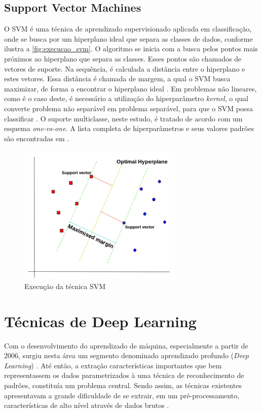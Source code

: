 \subsection{Support Vector Machines}

O SVM é uma técnica de aprendizado supervisionado aplicada em classificação, onde se busca por um hiperplano ideal que separa as classes de dados, conforme ilustra a \autoref{fig:execucao_svm}. O algoritmo se inicia com a busca pelos pontos mais próximos ao hiperplano que separa as classes. Esses pontos são chamados de vetores de suporte. Na sequência, é calculada a distância entre o hiperplano e estes vetores. Essa distância é chamada de margem, a qual o SVM busca maximizar, de forma a encontrar o hiperplano ideal \cite{Pupale2019}. Em problemas não lineares, como é o caso deste, é necessário a utilização do hiperparâmetro \textit{kernel}, o qual converte problema não separável em problema separável, para que o SVM possa classificar \cite{Shubham2018}. O suporte multiclasse, neste estudo, é tratado de acordo com um esquema \textit{one-vs-one}. A lista completa de hiperparâmetros e seus valores padrões são encontradas em .

\begin{figure}[h]
  \centering
  \caption{Execução da técnica SVM}
   \label{fig:execucao_svm}
   \includegraphics[width=0.7\textwidth]{figuras/fig_7.png}
\end{figure}

\section{Técnicas de Deep Learning}

Com o desenvolvimento do aprendizado de máquina, especialmente a partir de 2006, surgiu nesta área um segmento denominado aprendizado profundo (\textit{Deep Learning}) \cite{Deng2014}. Até então, a extração características importantes que bem representassem os dados parametrizados à uma técnica de reconhecimento de padrões, constituía um problema central. Sendo assim, as técnicas existentes apresentavam a grande dificuldade de se extrair, em um pré-processamento, características de alto nível através de dados brutos \cite{Goodfellow2016}. 

